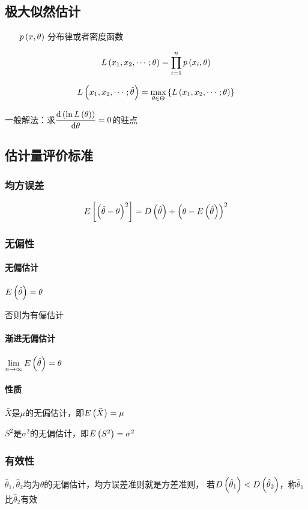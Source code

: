 \documentclass{article}
\begin{document}
\subsection{极大似然估计}

\begin{enumerate}
    \item [$p\left(x,\theta\right)$] 分布律或者密度函数
\end{enumerate}

\[L\left(x_1,x_2,\cdots;\theta\right)=\prod_{i=1}^np\left(x_i,\theta\right)\]

\[L\left(x_1,x_2,\cdots;\hat\theta\right)=\max_{\theta\in\Theta}\left\{L\left(x_1,x_2,\cdots;\theta\right)\right\}\]

一般解法：求$\dfrac{\mathrm d\left(\ln L\left(\theta\right)\right)}{\mathrm d\theta}=0$的驻点

\subsection{估计量评价标准}

\subsubsection{均方误差}

\[E\left[\left(\hat\theta-\theta\right)^2\right]=D\left(\hat\theta\right)+{\left(\theta-E\left(\hat\theta\right)\right)}^2\]

\subsubsection{无偏性}

\paragraph{无偏估计}$E\left(\hat\theta\right)=\theta$

否则为有偏估计

\paragraph{渐进无偏估计}$\lim\limits_{n\to\infty}E\left(\hat\theta\right)=\theta$

\paragraph{性质}

$\bar X$是$\mu$的无偏估计，即$E\left(\bar X\right)=\mu$

$S^2$是$\sigma^2$的无偏估计，即$E\left(S^2\right)=\sigma^2$

\subsubsection{有效性}

$\hat\theta_1,\hat\theta_2$均为$\theta$的无偏估计，均方误差准则就是方差准则，
若$D\left(\hat\theta_1\right)<D\left(\hat\theta_2\right)$，称$\hat\theta_1$比$\hat\theta_2$有效
\end{document}
